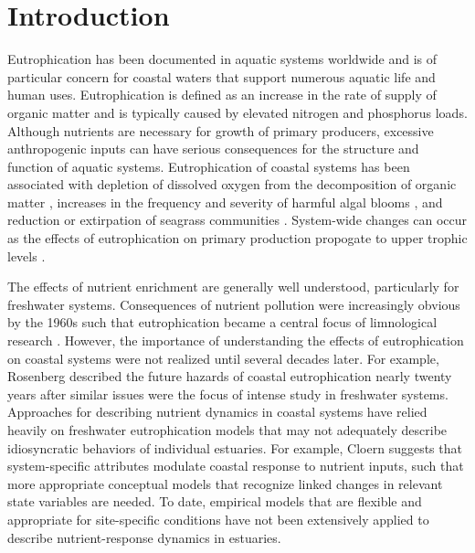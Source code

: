 \documentclass{svjour3}\usepackage[]{graphicx}\usepackage[]{color}
\begin{document}
\linenumbers

\acresetall
\section{Introduction} \label{intro}

Eutrophication has been documented in aquatic systems worldwide and is of particular concern for coastal waters that support numerous aquatic life and human uses.  Eutrophication is defined as an increase in the rate of supply of organic matter \cite{Nixon95} and is typically caused by elevated nitrogen and phosphorus loads.  Although nutrients are necessary for growth of primary producers, excessive anthropogenic inputs can have serious consequences for the structure and function of aquatic systems.  Eutrophication of coastal systems has been associated with depletion of dissolved oxygen from the decomposition of organic matter \cite{Diaz08}, increases in the frequency and severity of harmful algal blooms \cite{Glibert13}, and reduction or extirpation of seagrass communities \cite{Duarte95,Tomasko05}.  System-wide changes can occur as the effects of eutrophication on primary production propogate to upper trophic levels \cite{Powers05}. 

The effects of nutrient enrichment are generally well understood, particularly for freshwater systems. Consequences of nutrient pollution were increasingly obvious by the 1960s such that eutrophication became a central focus of limnological research \cite{Cloern01}.  However, the importance of understanding the effects of eutrophication on coastal systems were not realized until several decades later.  For example, Rosenberg \cite{Rosenberg85} described the future hazards of coastal eutrophication nearly twenty years after similar issues were the focus of intense study in freshwater systems.  Approaches for describing nutrient dynamics in coastal systems have relied heavily on freshwater eutrophication models that may not adequately describe idiosyncratic behaviors of individual estuaries.  For example, Cloern \cite{Cloern01} suggests that system-specific attributes modulate coastal response to nutrient inputs, such that more appropriate conceptual models that recognize linked changes in relevant state variables are needed.  To date, empirical models that are flexible and appropriate for site-specific conditions have not been extensively applied to describe nutrient-response dynamics in estuaries.
\end{document}

